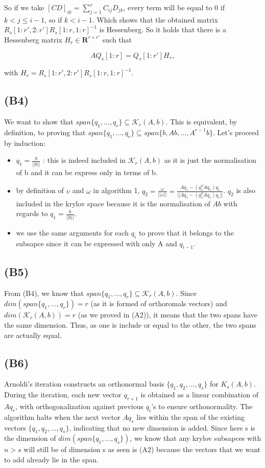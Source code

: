 \documentclass{article}
\begin{document}
So if we take \([CD]_{ik}=\sum_{j=1}^{r}C_{ij}D_{jk}\), every term will be equal to \(0\) if \(k<j\leq i-1\), so if \(k < i-1\). Which shows that the obtained matrix \(R_s[1:r', 2:r']R_s[1:r, 1:r]^{-1}\) is Hessenberg. So it holds that there is a Hessenberg matrix \(H_r\in \mathbf{R}^{r\times r'}\) such that

\[
A Q_s[1:r]  = Q_s[1:r'] H_r,
\]

with \(H_r=R_s[1:r', 2:r']R_s[1:r, 1:r]^{-1}\).


\subsection*{(B4)}
We want to show that $span\{q_1, ... , q_r\} \subseteq \mathcal{K}_r(A,b)$. This is equivalent, by definition, 
to proving that  $span\{q_1, ... , q_r\} \subseteq span \{ b, Ab,..., A^{r-1}b\}$.
Let's proceed by induction: 
\begin{itemize}
    \item $q_1 = \frac{b}{||b||}$ : this is indeed included in $\mathcal{K}_r(A,b)$ as it is just the normalisation of b
    and it can be express only in terms of b. 
    \item by definition of $\upsilon$ and $ \omega$ in algorithm 1, 
    $q_2 = \frac{\omega}{||\omega||} = \frac{A q_1 - (q_1^T A q_1)q_1}{||A q_1 - (q_1^T A q_1)q_1||}$. $q_2$ is also included in the krylov space because it is the normalisation of $Ab$ with regards to $q_1 = \frac{b}{||b||}$. 
    \item we use the same arguments for each $q_i$ to prove that it belongs to the subsapce since it can be expressed with only A and $q_{i-1}$. 
\end{itemize}

\subsection*{(B5)}
From (B4), we know that $span\{q_1, ... , q_r\} \subseteq \mathcal{K}_r(A,b)$.
Since $dim(span\{q_1, ... , q_r\}) = r$ (as it is formed of orthoromals vectors)
and $dim(\mathcal{K}_r(A,b)) = r$ (as we proved in (A2)), it means that the two spans have the same dimension. 
Thus, as one is include or equal to the other, the two spans are actually equal. 

\subsection*{(B6)}


Arnoldi's iteration constructs an orthonormal basis $ \{ q_1, q_2, \dots, q_s \} $ 
for $ K_s(A, b) $. 
During the iteration, each new vector $ q_{r+1} $ is obtained as a linear combination of $ A q_r $, 
with orthogonalization against previous $ q_i $'s to ensure orthonormality. The algorithm halts when the next vector $ A q_s $ lies within the span of the existing vectors $ \{ q_1, q_2, \dots, q_s \} $, indicating that no new dimension is added.
Since here s is the dimension of $dim(span\{q_1, ... , q_s\})$, we know that any krylov subsapces with $n>s$ will still
be of dimension s as seen is (A2) because the vectors that we want to add already lie in the span. 
\end{document}
